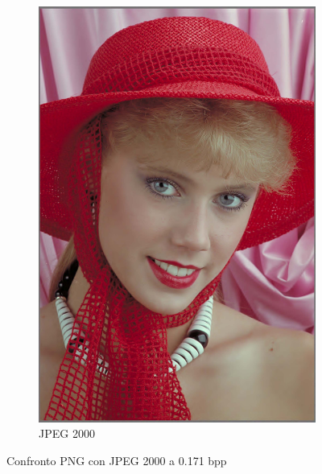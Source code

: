 \begin{figure}[h!]
\begin{subfigure}[]{0.3\textwidth}
        \includegraphics[width=\textwidth]{Immagini/IMAGES/JPEG2000_2_IMG0004.pdf}
        \caption{JPEG 2000}
        \label{fig:CompressedJPEG2000}
    \end{subfigure}
    \caption{Confronto PNG con JPEG 2000 a 0.171 bpp}
    \label{fig:CompressionJPEG2000}
\end{figure}

